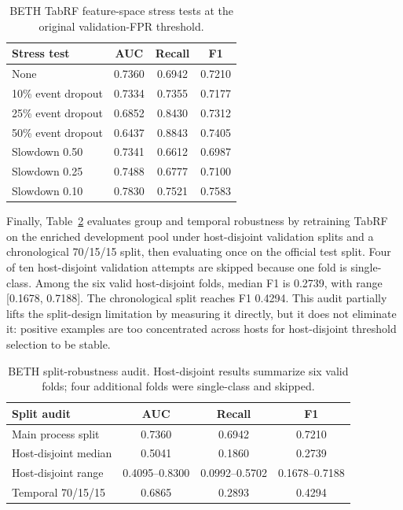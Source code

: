 \documentclass[10pt,journal,compsoc]{IEEEtran}
\begin{document}
\begin{table}[t]
\centering
\caption{BETH TabRF feature-space stress tests at the original validation-FPR threshold.}
\label{tab:beth_stress}
\begin{tabular}{lccc}
\toprule
\textbf{Stress test} & \textbf{AUC} & \textbf{Recall} & \textbf{F1} \\
\midrule
None & 0.7360 & 0.6942 & 0.7210 \\
10\% event dropout & 0.7334 & 0.7355 & 0.7177 \\
25\% event dropout & 0.6852 & 0.8430 & 0.7312 \\
50\% event dropout & 0.6437 & 0.8843 & 0.7405 \\
Slowdown 0.50 & 0.7341 & 0.6612 & 0.6987 \\
Slowdown 0.25 & 0.7488 & 0.6777 & 0.7100 \\
Slowdown 0.10 & 0.7830 & 0.7521 & 0.7583 \\
\bottomrule
\end{tabular}
\end{table}

Finally, Table~\ref{tab:beth_group_temporal} evaluates group and temporal robustness by retraining TabRF on the enriched development pool under host-disjoint validation splits and a chronological 70/15/15 split, then evaluating once on the official test split. Four of ten host-disjoint validation attempts are skipped because one fold is single-class. Among the six valid host-disjoint folds, median F1 is 0.2739, with range [0.1678, 0.7188]. The chronological split reaches F1 0.4294. This audit partially lifts the split-design limitation by measuring it directly, but it does not eliminate it: positive examples are too concentrated across hosts for host-disjoint threshold selection to be stable.

\begin{table}[t]
\centering
\caption{BETH split-robustness audit. Host-disjoint results summarize six valid folds; four additional folds were single-class and skipped.}
\label{tab:beth_group_temporal}
\begin{tabular}{lccc}
\toprule
\textbf{Split audit} & \textbf{AUC} & \textbf{Recall} & \textbf{F1} \\
\midrule
Main process split & 0.7360 & 0.6942 & 0.7210 \\
Host-disjoint median & 0.5041 & 0.1860 & 0.2739 \\
Host-disjoint range & 0.4095--0.8300 & 0.0992--0.5702 & 0.1678--0.7188 \\
Temporal 70/15/15 & 0.6865 & 0.2893 & 0.4294 \\
\bottomrule
\end{tabular}
\end{table}
\end{document}
